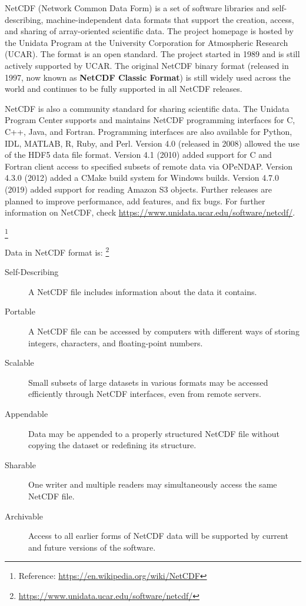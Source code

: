 {\itshape

NetCDF (Network Common Data Form) is a set of software libraries and self-describing, machine-independent data formats that support the creation, access, and sharing of array-oriented scientific data.
The project homepage is hosted by the Unidata Program at the University Corporation for Atmospheric Research (UCAR). The format is an open standard.
The project started in 1989 and is still actively supported by UCAR.
The original NetCDF binary format (released in 1997, now known as \textbf{NetCDF Classic Format}) is still widely used across the world and continues to be fully supported in all NetCDF releases.

NetCDF is also a community standard for sharing scientific data.
The Unidata Program Center supports and maintains NetCDF programming interfaces for C, C++, Java, and Fortran.
Programming interfaces are also available for Python, IDL, MATLAB, R, Ruby, and Perl.
Version 4.0 (released in 2008) allowed the use of the HDF5 data file format.
Version 4.1 (2010) added support for C and Fortran client access to specified subsets of remote data via OPeNDAP.
Version 4.3.0 (2012) added a CMake build system for Windows builds.
Version 4.7.0 (2019) added support for reading Amazon S3 objects. Further releases are planned to improve performance, add features, and fix bugs.
For further information on NetCDF, check \url{https://www.unidata.ucar.edu/software/netcdf/}.
}\footnote{Reference: \url{https://en.wikipedia.org/wiki/NetCDF}}

{\itshape

Data in NetCDF format is: \footnote{\url{https://www.unidata.ucar.edu/software/netcdf/}}

\begin{description}

\item[Self-Describing] A NetCDF file includes information about the data it contains.

\item[Portable] A NetCDF file can be accessed by computers with different ways of storing integers, characters, and floating-point numbers.

\item[Scalable] Small subsets of large datasets in various formats may be accessed efficiently through NetCDF interfaces, even from remote servers.

\item[Appendable] Data may be appended to a properly structured NetCDF file without copying the dataset or redefining its structure.

\item[Sharable] One writer and multiple readers may simultaneously access the same NetCDF file.

\item[Archivable] Access to all earlier forms of NetCDF data will be supported by current and future versions of the software.

\end{description}

}

